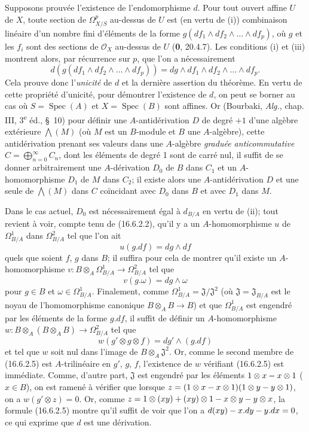 Supposons prouvée l'existence de l'endomorphisme $d$. Pour tout ouvert affine
$U$ de $X$, toute section de $\varOmega_{X/S}^p$ au-dessus de $U$ est (en vertu
de (i)) combinaison linéaire d'un nombre fini d'éléments de la forme
$g(df_1\wedge df_2\wedge\ldots\wedge df_p)$, où $g$ et les $f_i$ sont des
sections de $\mathcal{O}_X$ au-dessus de $U$ (\textbf{0}, 20.4.7). Les conditions (i)
et (iii) montrent alors, par récurrence sur $p$, que l'on a nécessairement
\[
  d(g(df_1\wedge df_2\wedge\ldots\wedge df_p))
  =dg\wedge df_1\wedge df_2\wedge\ldots\wedge df_p.
  \tag{16.6.2.2}
  \label{IV.16.6.2.2}
\]
Cela prouve donc l'\emph{unicité} de $d$ et la dernière assertion du théorème.
En vertu de cette propriété d'unicité, pour démontrer l'existence de $d$, on
peut se borner au cas où $S=\operatorname{Spec}(A)$ et
$X=\operatorname{Spec}(B)$ sont affines. Or (Bourbaki, \emph{Alg.}, chap.
III, 3\textsuperscript{e} éd., \S~10) pour définir une $A$-antidérivation
$D$ de degré $+1$ d'une algèbre extérieure $\bigwedge(M)$ (où $M$ est un
$B$-module et $B$ une $A$-algèbre), cette antidérivation prenant ses valeurs
dans une $A$-algèbre \emph{graduée anticommutative}
$C=\bigoplus_{n=0}^{\infty}C_n$, dont les éléments de degré 1 sont de carré
nul, il suffit de se donner arbitrairement une $A$-dérivation $D_0$ de $B$
dans $C_1$ et un $A$-homomorphisme $D_1$ de $M$ dans $C_2$; il existe alors
une $A$-antidérivation $D$ et une seule de $\bigwedge(M)$ dans $C$
coïncidant avec $D_0$ dans $B$ et avec $D_1$ dans $M$.

Dans le cas actuel, $D_0$ est nécessairement égal à $d_{B/A}$ en vertu de
(ii); tout revient à voir, compte tenu de (16.6.2.2), qu'il y a un
$A$-homomorphisme $u$ de $\Omega_{B/A}^1$ dans $\Omega_{B/A}^2$ tel que
l'on ait
\[
  u(g.df)=dg\wedge df
  \tag{16.6.2.3}
  \label{IV.16.6.2.3}
\]
quels que soient $f$, $g$ dans $B$; il suffira pour cela de montrer qu'il
existe un $A$-homomorphisme
$v:B\otimes_A\Omega_{B/A}^1\to\Omega_{B/A}^2$ tel que
\[
  v(g.\omega)=dg\wedge\omega
  \tag{16.6.2.4}
  \label{IV.16.6.2.4}
\]
pour $g\in B$ et $\omega\in\Omega_{B/A}^1$. Finalement, comme
$\Omega_{B/A}^1=\mathfrak{J}/\mathfrak{J}^2$ (où
$\mathfrak{J}=\mathfrak{J}_{B/A}$ est le noyau de l'homomorphisme canonique
$B\otimes_A B\to B$) et que $\Omega_{B/A}^1$ est engendré par les éléments
de la forme $g.df$, il suffit de définir un $A$-homomorphisme
$w:B\otimes_A(B\otimes_A B)\to\Omega_{B/A}^2$ tel que
\[
  w(g'\otimes g\otimes f)=dg'\wedge(g.df)
  \tag{16.6.2.5}
  \label{IV.16.6.2.5}
\]
et tel que $w$ soit nul dans l'image de $B\otimes_A\mathfrak{J}^2$. Or,
comme le second membre de (16.6.2.5) est $A$-trilinéaire en $g'$, $g$, $f$,
l'existence de $w$ vérifiant (16.6.2.5) est immédiate. Comme, d'autre part,
$\mathfrak{J}$ est engendré par les éléments $1\otimes x- x\otimes1$
($x\in B$), on est ramené à vérifier que lorsque
$z=(1\otimes x- x\otimes1)(1\otimes y- y\otimes1)$, on a
$w(g'\otimes z)=0$. Or, comme
$z=1\otimes(xy)+(xy)\otimes1- x\otimes y- y\otimes x$, la formule (16.6.2.5)
montre qu'il
suffit de voir que l'on a $d(xy)- x.dy- y.dx=0$, ce qui exprime que $d$ est une
dérivation.

